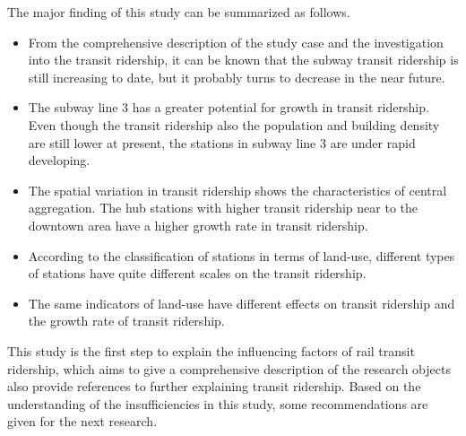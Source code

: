 %
The major finding of this study can be summarized as follows. 

%
\begin{itemize}
	\item From the comprehensive description of the study case and the investigation into the transit ridership, it can be known that the subway transit ridership is still increasing to date, but it probably turns to decrease in the near future. 
	
	\item The subway line 3 has a greater potential for growth in transit ridership. Even though the transit ridership also the population and building density are still lower at present, the stations in subway line 3 are under rapid developing.
	
	\item The spatial variation in transit ridership shows the characteristics of central aggregation. The hub stations with higher transit ridership near to the downtown area have a higher growth rate in transit ridership.
	
	\item According to the classification of stations in terms of land-use, different types of stations have quite different scales on the transit ridership.
	
	\item The same indicators of land-use have different effects on transit ridership and the growth rate of transit ridership.
\end{itemize}

%
This study is the first step to explain the influencing factors of rail transit ridership, which aims to give a comprehensive description of the research objects also provide references to further explaining transit ridership. Based on the understanding of the insufficiencies in this study, some recommendations are given for the next research.

